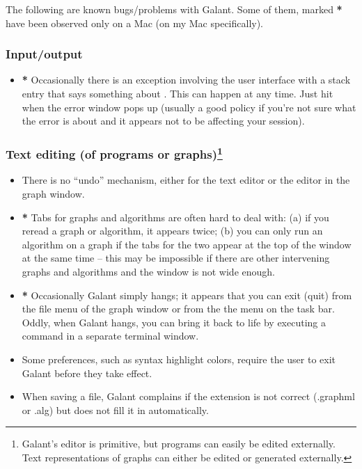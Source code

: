 The following are known bugs/problems with Galant. Some of them, marked
\textbf{*} have been observed only on a Mac (on my Mac specifically).

\subsubsection*{Input/output}

\begin{itemize}
  
\item \textbf{*} Occasionally there is an exception involving the user
  interface with a stack entry that says something about
  . This can happen at any time. Just hit 
  when the error window pops up (usually a good policy if you're not sure
  what the error is about and it appears not to be affecting your session).
\end{itemize}

\subsubsection*{Text editing (of programs or graphs)\footnote{
Galant's editor  is primitive, but
programs can easily be edited externally.
Text representations of graphs can either be edited or generated externally.}}

\begin{itemize}

\item There is no ``undo'' mechanism, either for the text editor or the
  editor in the graph window.

\item \textbf{*} Tabs for graphs and algorithms are often hard to deal with: (a) if you
  reread a graph or algorithm, it appears twice; (b) you can only run an
  algorithm on a graph if the tabs for the two appear at the top of the
  window at the same time -- this
  may be impossible if there are other intervening graphs and algorithms
  and the window is not wide enough.

\item \textbf{*} Occasionally Galant simply hangs;
  it appears that you can exit (quit) from
  the file menu of the graph window or from the the  menu on the
  task bar.
  Oddly, when Galant hangs, you can bring it back to life by executing a
  command in a separate terminal window.

\item
  Some preferences, such as syntax highlight colors, require the user to exit
  Galant before they take effect.

\item
  When saving a file, Galant complains if the extension is not correct
  (\textsf{.graphml} or \textsf{.alg}) but does not fill it in automatically.

\end{itemize}


